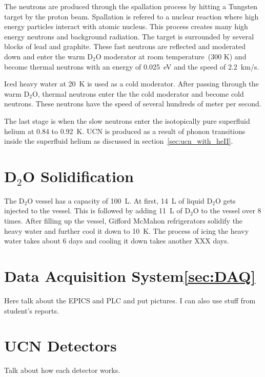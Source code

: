 The neutrons are produced through the spallation process by hitting a
Tungsten target by the proton beam. Spallation is refered to a nuclear
reaction where high energy particles interact with atomic
nucleus. This process creates many high energy neutrons and background
radiation.  The target is surrounded by several blocks of lead and
graphite. These fast neutrons
are reflected and moderated down and enter the warm D$_2$O moderator at room temperature~(300 K) and become thermal
neutrons with an energy of 0.025~eV and the speed of 2.2~km/s.

Iced heavy water at 20~K is used as a cold moderator. After passing
through the warm D$_2$O, thermal neutrons enter the the cold moderator
and become cold neutrons. These neutrons have the speed of several
hundreds of meter per second.

The last stage is when the slow neutrons enter the isotopically pure superfluid helium
at 0.84 to 0.92~K. UCN is produced as a result of phonon transitions
inside the superfluid helium as discussed in section~\ref{sec:ucn_with_heII}.


\section{D$_2$O Solidification}
The D$_2$O vessel has a capacity of 100~L. At first, 14~L of liquid
D$_2$O gets injected to the vessel. This is followed by adding 11~L of
D$_2$O to the vessel over 8 times.  After filling up the vessel,
Gifford McMahon refrigerators solidify the heavy water and further
cool it down to 10~K. The process of icing the heavy water takes about
6 days and cooling it down takes another XXX days.

\section{Data Acquisition System\ref{sec:DAQ}}
Here talk about the EPICS and PLC and put pictures. I can also use
stuff from student's reports.

\section{UCN Detectors}
Talk about how each detector works.
